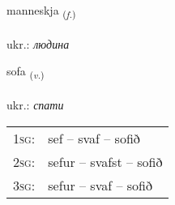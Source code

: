 \documentclass[frontgrid, backgrid]{flacards}\usepackage[]{graphicx}\usepackage[]{xcolor}
\begin{document}
\renewcommand{\flhead}{\vskip5pt \fboxsep=0pt {\small\bfseries\footnotesize Nafnorð | іменник}}
\renewcommand{\fcfoot}{\vskip5pt \fboxsep=0pt \hspace{2pt}{\small\bfseries\footnotesize 1K}}

\renewcommand{\blhead}{\vskip5pt {\small\bfseries\footnotesize Nafnorð | іменник }}
\renewcommand{\bcfoot}{\vskip5pt \hspace{2pt}{\small\bfseries\footnotesize 1K}}


{manneskja \small{\textsubscript{(\textit{f.})}} \\[1ex] %
\textphonetic{[manɛsca]} \\
ukr.: \emph{людина} \\  [2ex]
\renewcommand*{\arraystretch}{0.8}
}

\renewcommand{\flhead}{\vskip5pt \fboxsep=0pt {\small\bfseries\footnotesize Sagnorð | дієслово}}
\renewcommand{\fcfoot}{\vskip5pt \fboxsep=0pt \hspace{2pt}{\small\bfseries\footnotesize 1K}}

\renewcommand{\blhead}{\vskip5pt {\small\bfseries\footnotesize Sagnorð | дієслово }}
\renewcommand{\bcfoot}{\vskip5pt \hspace{2pt}{\small\bfseries\footnotesize 1K}}


{sofa \small{\textsubscript{(\textit{v.})}} \\[1ex] %
\textphonetic{[sɔːva]} \\
ukr.: \emph{спати} \\  [2ex]
\renewcommand*{\arraystretch}{0.8}
\begin{tabular}{p{1cm}l}
\textsc{1sg}: & sef -- svaf -- sofið \\ 
\textsc{2sg}: & sefur -- svafst -- sofið \\ 
\textsc{3sg}: & sefur -- svaf -- sofið \\ 
\end{tabular}
}
\end{document}
